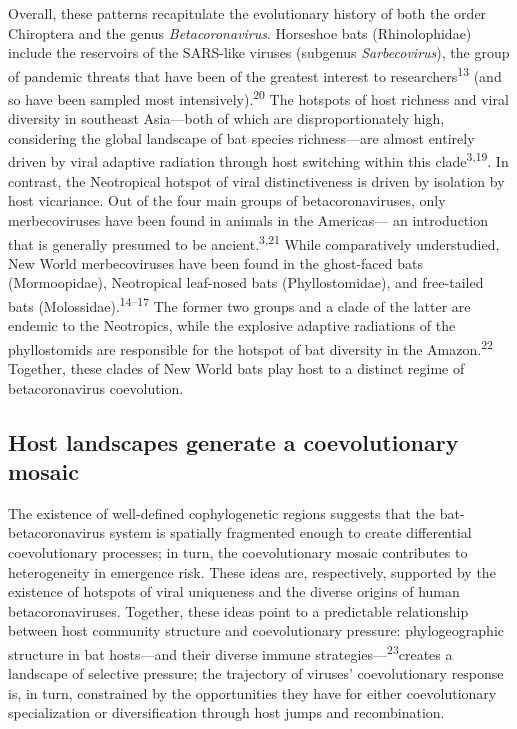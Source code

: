 \documentclass[11pt]{article}
\begin{document}
Overall, these patterns recapitulate the evolutionary history of both
the order Chiroptera and the genus \emph{Betacoronavirus}. Horseshoe
bats (Rhinolophidae) include the reservoirs of the SARS-like viruses
(subgenus \emph{Sarbecovirus}), the group of pandemic threats that have
been of the greatest interest to researchers\textsuperscript{13} (and so
have been sampled most intensively).\textsuperscript{20} The hotspots of
host richness and viral diversity in southeast Asia---both of which are
disproportionately high, considering the global landscape of bat species
richness---are almost entirely driven by viral adaptive radiation
through host switching within this clade\textsuperscript{3,19}. In
contrast, the Neotropical hotspot of viral distinctiveness is driven by
isolation by host vicariance. Out of the four main groups of
betacoronaviruses, only merbecoviruses have been found in animals in the
Americas--- an introduction that is generally presumed to be
ancient.\textsuperscript{3,21} While comparatively understudied, New
World merbecoviruses have been found in the ghost-faced bats
(Mormoopidae), Neotropical leaf-nosed bats (Phyllostomidae), and
free-tailed bats (Molossidae).\textsuperscript{14--17} The former two
groups and a clade of the latter are endemic to the Neotropics, while
the explosive adaptive radiations of the phyllostomids are responsible
for the hotspot of bat diversity in the Amazon.\textsuperscript{22}
Together, these clades of New World bats play host to a distinct regime
of betacoronavirus coevolution.

\hypertarget{host-landscapes-generate-a-coevolutionary-mosaic}{%
\subsection{Host landscapes generate a coevolutionary
mosaic}\label{host-landscapes-generate-a-coevolutionary-mosaic}}

The existence of well-defined cophylogenetic regions suggests that the
bat-betacoronavirus system is spatially fragmented enough to create
differential coevolutionary processes; in turn, the coevolutionary
mosaic contributes to heterogeneity in emergence risk. These ideas are,
respectively, supported by the existence of hotspots of viral uniqueness
and the diverse origins of human betacoronaviruses. Together, these
ideas point to a predictable relationship between host community
structure and coevolutionary pressure: phylogeographic structure in bat
hosts---and their diverse immune
strategies---\textsuperscript{23}creates a landscape of selective
pressure; the trajectory of viruses' coevolutionary response is, in
turn, constrained by the opportunities they have for either
coevolutionary specialization or diversification through host jumps and
recombination.
\end{document}
